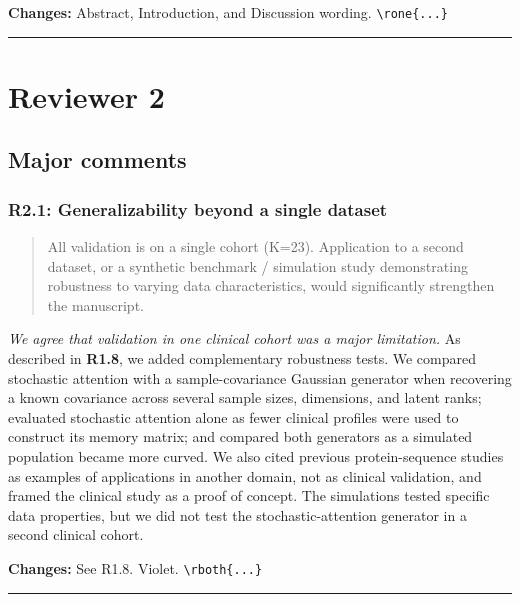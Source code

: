 \documentclass[
  11pt,
  letterpaper,
]{article}
\begin{document}
\textbf{Changes:} Abstract, Introduction, and Discussion wording. \texttt{\textbackslash{}rone\{...\}}

\begin{center}\rule{0.5\linewidth}{0.5pt}\end{center}

\section{Reviewer 2}\label{reviewer-2}

\subsection{Major comments}\label{major-comments-1}

\subsubsection{R2.1: Generalizability beyond a single dataset}\label{r21-generalizability-beyond-a-single-dataset}

\begin{quote}
All validation is on a single cohort (K=23). Application to a second dataset, or a synthetic benchmark / simulation study demonstrating robustness to varying data characteristics, would significantly strengthen the manuscript.
\end{quote}

\emph{We agree that validation in one clinical cohort was a major limitation.} As described in \textbf{R1.8}, we added complementary robustness tests. We compared stochastic attention with a sample-covariance Gaussian generator when recovering a known covariance across several sample sizes, dimensions, and latent ranks; evaluated stochastic attention alone as fewer clinical profiles were used to construct its memory matrix; and compared both generators as a simulated population became more curved. We also cited previous protein-sequence studies as examples of applications in another domain, not as clinical validation, and framed the clinical study as a proof of concept. The simulations tested specific data properties, but we did not test the stochastic-attention generator in a second clinical cohort.

\textbf{Changes:} See R1.8. Violet. \texttt{\textbackslash{}rboth\{...\}}

\begin{center}\rule{0.5\linewidth}{0.5pt}\end{center}
\end{document}
